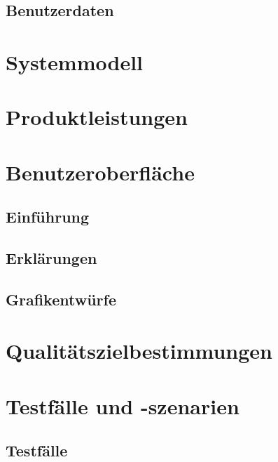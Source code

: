 \documentclass[oneside, ngerman]{sdqtechreport}
\begin{document}
\section{Benutzerdaten}
\label{sec:Produktdaten:Benutzerdaten}



\chapter{Systemmodell}
\label{chap:Systemmodell}



\chapter{Produktleistungen}
\label{chap:Produktleistungen}



\chapter{Benutzeroberfläche}
\label{chap:Benutzeroberfläche}

\section{Einführung}
\label{sec:Benutzeroberfläche:Einführung}

\section{Erklärungen}
\label{sec:Benutzeroberfläche:Erklärungen}

\section{Grafikentwürfe}
\label{sec:Benutzeroberfläche:Grafikentwürfe}



\chapter{Qualitätszielbestimmungen}
\label{chap:Qualitätszielbestimmungen}



\chapter{Testfälle und -szenarien}
\label{chap:Tests}

\section{Testfälle}
\label{sec:Tests:Testfälle}
\end{document}
